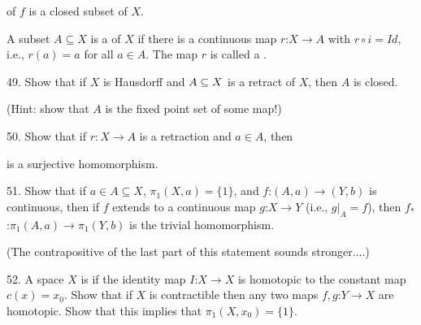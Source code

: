 \ssk


\ssk

\item{} of $f$ is a closed subset of $X$.

\ssk

\item{} A subset $A\subseteq X$ is a  of $X$ if there is a continuous
map $r$:$X\rightarrow A$ with $r\circ i = Id$, i.e., $r(a)=a$ for all $a\in A$. The map
$r$ is called a .

\ssk

\item{49.} Show that if $X$ is Hausdorff and $A\subseteq X$ is a retract of $X$, then $A$ is
closed. 

\ssk

\item{} (Hint: show that $A$ is the fixed point set of some map!)

\ssk

\item{50.} Show that if $r: X\rightarrow A$ is a retraction and $a\in A$, then

\ssk


\ssk

\item{} is a surjective homomorphism.

\ssk

\item{51.} Show that if $a\in A\subseteq X$, $\pi_1(X,a) = \{1\}$, and 
$f$:\hsk $(A,a)\rightarrow (Y,b)$ is continuous, then if $f$ extends to a continuous 
map $g$:$X\rightarrow Y$ (i.e., $g|_A = f$), then 
$f_*$:$\pi_1(A,a)\rightarrow \pi_1(Y,b)$ is the trivial homomorphism.

\ssk

\item{} (The contrapositive of the last part of this statement sounds stronger....)

\ssk

\item{52.} A space $X$ is  if the identity map $I$:$X\rightarrow X$
is homotopic to the constant map $c(x)=x_0$. Show that if $X$ is contractible then
any two maps $f,g$\hsk :\hsk $Y\rightarrow X$ are homotopic. Show that this implies that 
$\pi_1(X,x_0) = \{1\}$.

\ssk


